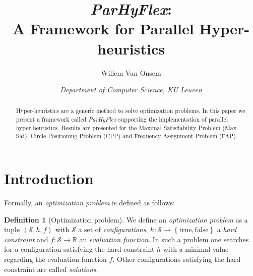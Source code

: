 \documentclass[a4paper,10pt]{article}
\title{\emph{ParHyFlex}:\\A Framework for Parallel Hyper-heuristics}
\author{Willem Van Onsem}%
\date{\textit{Department of Computer Science, KU Leuven}}%
\newcommand{\seclab}[1]{\label{sec:#1}}
\newcommand{\tupl}[1]{\ensuremath{\left\langle #1 \right\rangle}}
\newcommand{\accl}[1]{\ensuremath{\left\{ #1 \right\}}}
\newcommand{\BoolSet}{\accl{\mbox{true},\mbox{false}}}
\newcommand{\calS}{\ensuremath{\mathcal{S}}}
\newcommand{\RR}{\ensuremath{\mathbb{R}}}
\theoremstyle{definition}
\newtheorem{definition}{Definition}
\begin{document}
\ttl
\thispagestyle{empty}


\begin{abstract}
\noindent
Hyper-heuristics are a generic method to solve optimization problems. In this paper we present a framework called \emph{ParHyFlex} supporting the implementation of parallel hyper-heuristics. Results are presented for the Maximal Satisfiability Problem (Max-Sat), Circle Positioning Problem (CPP) and Frequency Assignment Problem (FAP).
\end{abstract}

\section{Introduction}
\seclab{hyper-heuristics}
Formally, an \emph{optimization problem} is defined as follows:
\begin{definition}[Optimization problem]
We define an \emph{optimization problem} as a tuple $\tupl{\calS,h,f}$ with $\calS$ a set of \emph{configurations}, $h:\calS\rightarrow\BoolSet$ a \emph{hard constraint} and $f:\calS\rightarrow\RR$ an \emph{evaluation function}. In such a problem one searches for a configuration satisfying the hard constraint $h$ with a minimal value regarding the evaluation function $f$. Other configurations satisfying the hard constraint are called \emph{solutions}.
\end{definition}
\end{document}
